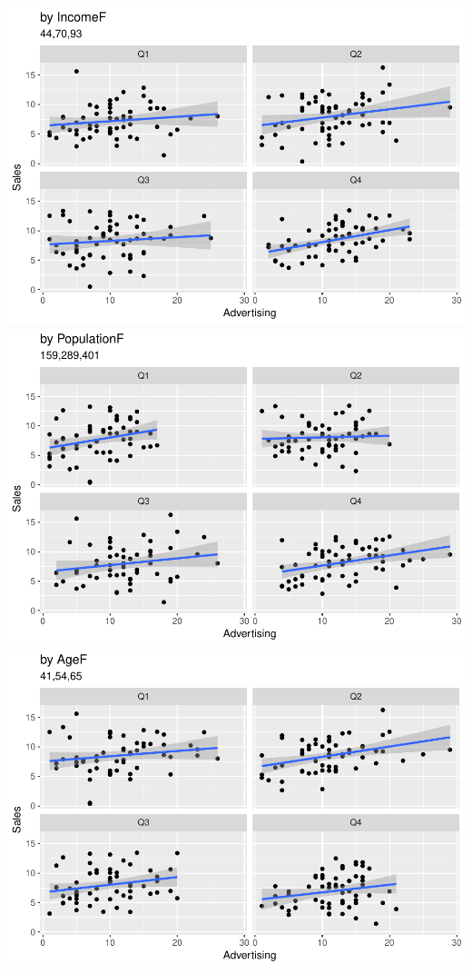\documentclass[a4paper]{article}
\begin{document}
\includegraphics{class3_rmd_pdf_files/figure-latex/unnamed-chunk-9-1.pdf}
\includegraphics{class3_rmd_pdf_files/figure-latex/unnamed-chunk-9-2.pdf}
\includegraphics{class3_rmd_pdf_files/figure-latex/unnamed-chunk-9-3.pdf}
\end{document}
